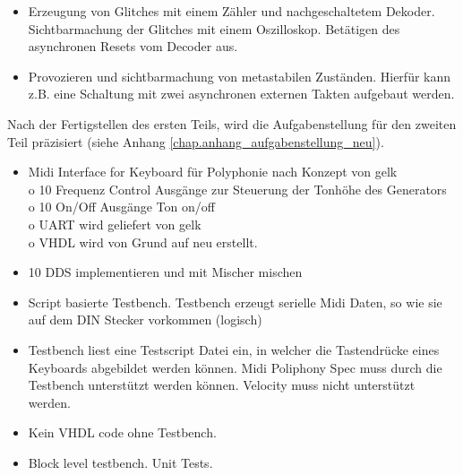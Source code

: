  
\begin{itemize}
	\item Erzeugung von Glitches mit einem Zähler und nachgeschaltetem Dekoder. Sichtbarmachung der Glitches mit einem Oszilloskop. Betätigen des asynchronen Resets vom Decoder aus.

	\item Provozieren und sichtbarmachung von metastabilen Zuständen. Hierfür kann z.B. eine Schaltung mit zwei asynchronen externen Takten aufgebaut werden.
\end{itemize}  


Nach der Fertigstellen des ersten Teils, wird die Aufgabenstellung für den zweiten Teil präzisiert (siehe Anhang \ref{chap.anhang_aufgabenstellung_neu}).\\ 
\begin{itemize}
\item Midi Interface for Keyboard für Polyphonie nach Konzept von gelk\\
o   10 Frequenz Control Ausgänge zur Steuerung der Tonhöhe des Generators\\
o   10 On/Off Ausgänge Ton on/off\\
o   UART wird geliefert von gelk\\
o   VHDL wird von Grund auf neu erstellt.
\item 10 DDS implementieren und mit Mischer mischen
\item Script basierte Testbench. Testbench erzeugt serielle Midi Daten, so wie sie auf dem DIN Stecker vorkommen (logisch)
\item Testbench liest eine Testscript Datei ein, in welcher die Tastendrücke eines Keyboards abgebildet werden können. Midi Poliphony Spec muss durch die Testbench unterstützt werden können. Velocity muss nicht unterstützt werden.
\item Kein VHDL code ohne Testbench.
\item Block level testbench. Unit Tests.
\end{itemize}

